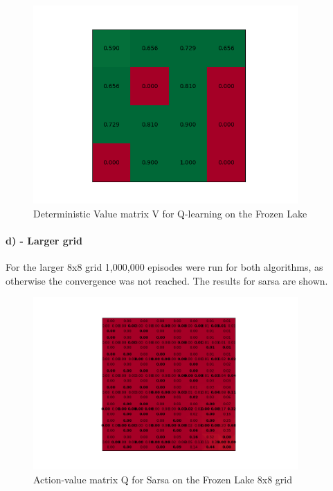 \documentclass{article}
\begin{document}
\begin{figure}[H]
\centering
\includegraphics[width=0.9\textwidth]{figures/V_q_det.png}
\caption{Deterministic Value matrix V for Q-learning on the Frozen Lake}
\label{fig:V_q_det}
\end{figure}



\paragraph*{d) - Larger grid}

For the larger 8x8 grid 1,000,000 episodes were run for both algorithms, as otherwise the convergence was not reached. The results for sarsa are shown.

\begin{figure}[H]
\centering
\includegraphics[width=0.9\textwidth]{figures/Long_Q_sarsa.png}
\caption{Action-value matrix Q for Sarsa on the Frozen Lake 8x8 grid}
\label{fig:long_q_sarsa}
\end{figure}
\end{document}

